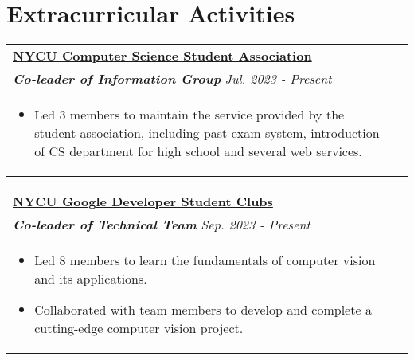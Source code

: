 \documentclass[a4paper,8pt]{article}
\begin{document}
\section{Extracurricular Activities}
\begin{tabularx}{\linewidth}{ @{}l r@{} }
\textbf{\uline{{NYCU Computer Science Student Association}}}  \\
\color[HTML]{371e77}\textbf{\textit{Co-leader of Information Group}} \hfill \color[HTML]{4B28A4} \textit{Jul. 2023 - Present} \\
\begin{minipage}[t]{\linewidth}
    \begin{itemize}[nosep,after=\strut, leftmargin=2em, itemsep=2pt]
        \item Led 3 members to maintain the service provided by the student association, including past exam system, introduction of CS department for high school and several web services.
    \end{itemize}
    \end{minipage}
\end{tabularx}
\begin{tabularx}{\linewidth}{ @{}l r@{} }
\textbf{\uline{{NYCU Google Developer Student Clubs}}}  \\
\color[HTML]{371e77}\textbf{\textit{Co-leader of Technical Team}} \hfill \color[HTML]{4B28A4} \textit{Sep. 2023 - Present} \\
\begin{minipage}[t]{\linewidth}
    \begin{itemize}[nosep,after=\strut, leftmargin=2em, itemsep=2pt]
        \item Led 8 members to learn the fundamentals of computer vision and its applications.
        \item Collaborated with team members to develop and complete a cutting-edge computer vision project.
    \end{itemize}
    \end{minipage}
\end{tabularx}
\end{document}
